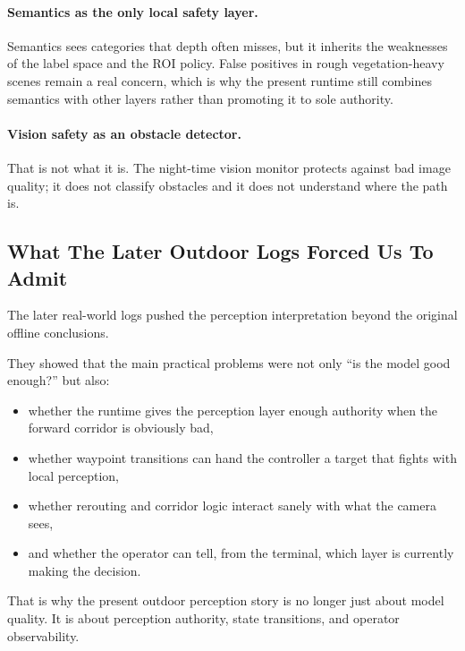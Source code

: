 \documentclass[11pt]{article}
\begin{document}
\paragraph{Semantics as the only local safety layer.}
Semantics sees categories that depth often misses, but it inherits the weaknesses of the label space and the ROI policy. False positives in rough vegetation-heavy scenes remain a real concern, which is why the present runtime still combines semantics with other layers rather than promoting it to sole authority.

\paragraph{Vision safety as an obstacle detector.}
That is not what it is. The night-time vision monitor protects against bad image quality; it does not classify obstacles and it does not understand where the path is.

\subsection{What The Later Outdoor Logs Forced Us To Admit}
The later real-world logs pushed the perception interpretation beyond the original offline conclusions.

They showed that the main practical problems were not only ``is the model good enough?'' but also:
\begin{itemize}[leftmargin=*]
\item whether the runtime gives the perception layer enough authority when the forward corridor is obviously bad,
\item whether waypoint transitions can hand the controller a target that fights with local perception,
\item whether rerouting and corridor logic interact sanely with what the camera sees,
\item and whether the operator can tell, from the terminal, which layer is currently making the decision.
\end{itemize}

That is why the present outdoor perception story is no longer just about model quality. It is about perception authority, state transitions, and operator observability.
\end{document}
